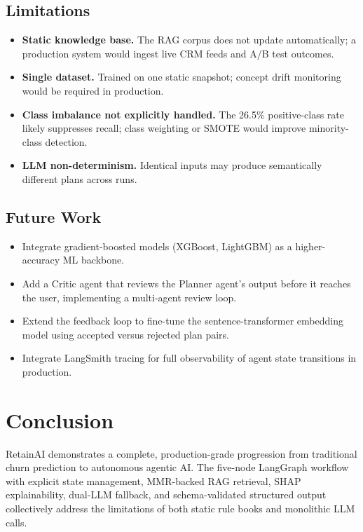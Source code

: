 \documentclass[11pt]{article}
\begin{document}
\subsection{Limitations}

\begin{itemize}
  \item \textbf{Static knowledge base.} The RAG corpus does not update
        automatically; a production system would ingest live CRM feeds and
        A/B test outcomes.
  \item \textbf{Single dataset.} Trained on one static snapshot; concept
        drift monitoring would be required in production.
  \item \textbf{Class imbalance not explicitly handled.} The 26.5\%
        positive-class rate likely suppresses recall; class weighting or
        SMOTE would improve minority-class detection.
  \item \textbf{LLM non-determinism.} Identical inputs may produce
        semantically different plans across runs.
\end{itemize}

\subsection{Future Work}

\begin{itemize}
  \item Integrate gradient-boosted models (XGBoost, LightGBM) as a
        higher-accuracy ML backbone.
  \item Add a Critic agent that reviews the Planner agent's output before
        it reaches the user, implementing a multi-agent review loop.
  \item Extend the feedback loop to fine-tune the sentence-transformer
        embedding model using accepted versus rejected plan pairs.
  \item Integrate LangSmith tracing for full observability of agent state
        transitions in production.
\end{itemize}

\section{Conclusion}
\label{sec:conclusion}

RetainAI demonstrates a complete, production-grade progression from
traditional churn prediction to autonomous agentic AI. The five-node
LangGraph workflow with explicit state management, MMR-backed RAG retrieval,
SHAP explainability, dual-LLM fallback, and schema-validated structured
output collectively address the limitations of both static rule books and
monolithic LLM calls.
\end{document}

